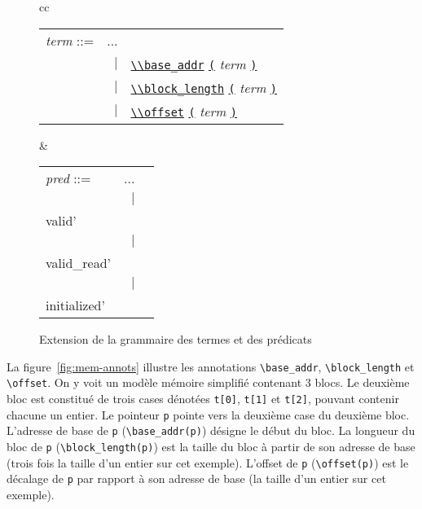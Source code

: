 \begin{figure}
  \centering
  \begin{tabular}{cc}
    \begin{tabular}{lrl}
      \textit{term} ::= & ... \\
      & $\mid$
      & \underline{\lstinline'\\base_addr'} \underline{\lstinline'('} \textit{term} \underline{\lstinline')'} \\
      & $\mid$
      & \underline{\lstinline'\\block_length'} \underline{\lstinline'('} \textit{term} \underline{\lstinline')'} \\
      & $\mid$
      & \underline{\lstinline'\\offset'} \underline{\lstinline'('} \textit{term} \underline{\lstinline')'} \\
    \end{tabular}
    &
    \begin{tabular}{lrl}
      \textit{pred} ::= & ... \\
      & $\mid$
      & \underline{\lstinline'\\valid'} \underline{\lstinline'('} \textit{term} \underline{\lstinline')'} \\
      & $\mid$
      & \underline{\lstinline'\\valid_read'} \underline{\lstinline'('} \textit{term} \underline{\lstinline')'} \\
      & $\mid$
      & \underline{\lstinline'\\initialized'} \underline{\lstinline'('} \textit{term} \underline{\lstinline')'} \\
    \end{tabular}
  \end{tabular}
  \caption{Extension de la grammaire des termes et des prédicats
    \label{fig:gram-ext}}
\end{figure}





La figure~\ref{fig:mem-annots} illustre les annotations \lstinline{\base_addr},
\lstinline{\block_length} et \lstinline{\offset}.
On y voit un modèle mémoire simplifié contenant 3 blocs.
Le deuxième bloc est constitué de trois cases dénotées \lstinline't[0]',
\lstinline't[1]' et \lstinline't[2]', pouvant contenir chacune un entier.
Le pointeur \lstinline'p' pointe vers la deuxième case du deuxième bloc.
L'adresse de base de \lstinline'p' (\lstinline'\base_addr(p)') désigne le
début du bloc.
La longueur du bloc de \lstinline'p' (\lstinline'\block_length(p)') est la
taille du bloc à partir de son adresse de base (trois fois la taille d'un entier
sur cet exemple).
L'offset de \lstinline'p' (\lstinline'\offset(p)') est le décalage de
\lstinline'p' par rapport à son adresse de base (la taille d'un entier sur cet
exemple).



